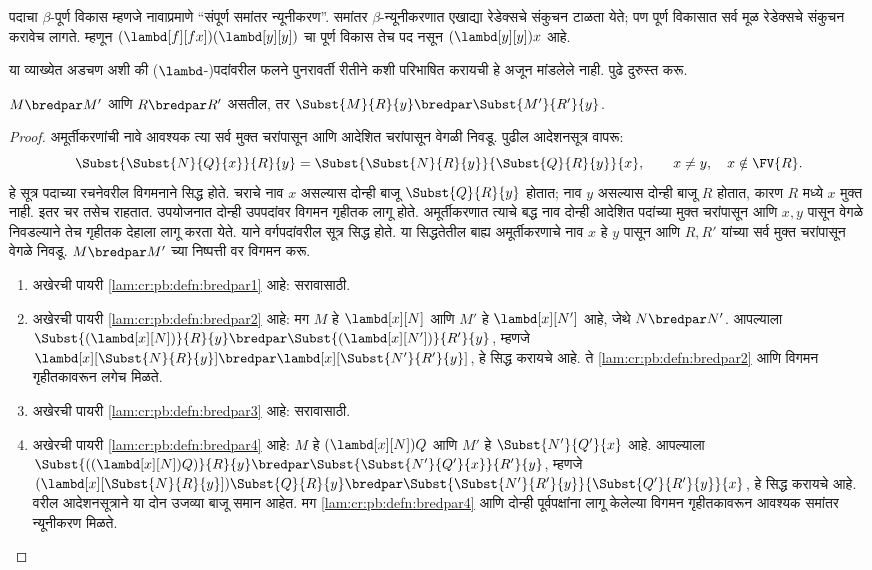 पदाचा $\beta$-पूर्ण विकास म्हणजे नावाप्रमाणे
``संपूर्ण समांतर न्यूनीकरण''. समांतर $\beta$-न्यूनीकरणात
एखाद्या रेडेक्सचे संकुचन टाळता येते; पण पूर्ण विकासात
सर्व मूळ रेडेक्सचे संकुचन करावेच लागते. म्हणून
$(\lambd[f][fx])(\lambd[y][y])$ चा पूर्ण विकास तेच
पद नसून $(\lambd[y][y])x$ आहे.

\begin{editorial}
  या व्याख्येत अडचण अशी की ($\lambd$-)पदांवरील फलने
  पुनरावर्ती रीतीने कशी परिभाषित करायची हे अजून
  मांडलेले नाही. पुढे दुरुस्त करू.
\end{editorial}

\begin{lem}\label{lam:cr:pb:lem:comp}
  $M \bredpar M'$ आणि $R \bredpar R'$ असतील, तर $\Subst{M}{R}{y}
  \bredpar \Subst{M'}{R'}{y}$.
\end{lem}

\begin{proof}

अमूर्तीकरणांची नावे आवश्यक त्या सर्व मुक्त चरांपासून
आणि आदेशित चरांपासून वेगळी निवडू. पुढील आदेशनसूत्र वापरू:
\[\Subst{\Subst{N}{Q}{x}}{R}{y}
=\Subst{\Subst{N}{R}{y}}{\Subst{Q}{R}{y}}{x},
\qquad x\ne y,\quad x\notin\FV{R}.
\]
हे सूत्र पदाच्या रचनेवरील विगमनाने सिद्ध होते. चराचे नाव
$x$ असल्यास दोन्ही बाजू $\Subst{Q}{R}{y}$ होतात;
नाव $y$ असल्यास दोन्ही बाजू $R$ होतात, कारण $R$ मध्ये
$x$ मुक्त नाही. इतर चर तसेच राहतात. उपयोजनात दोन्ही
उपपदांवर विगमन गृहीतक लागू होते. अमूर्तीकरणात त्याचे
बद्ध नाव दोन्ही आदेशित पदांच्या मुक्त चरांपासून आणि
$x,y$ पासून वेगळे निवडल्याने तेच गृहीतक देहाला लागू
करता येते. याने वर्गपदांवरील सूत्र सिद्ध होते.
या सिद्धतेतील बाह्य अमूर्तीकरणाचे नाव $x$ हे $y$ पासून
आणि $R,R'$ यांच्या सर्व मुक्त चरांपासून वेगळे निवडू.
  $M \bredpar M'$ च्या निष्पत्ती वर विगमन करू.
  \begin{enumerate}
    \item अखेरची पायरी \ref{lam:cr:pb:defn:bredpar1} आहे: सरावासाठी.
    \item अखेरची पायरी \ref{lam:cr:pb:defn:bredpar2} आहे: मग $M$ हे
      $\lambd[x][N]$ आणि $M'$ हे $\lambd[x][N']$ आहे,
      जेथे $N \bredpar N'$. आपल्याला
      $\Subst{(\lambd[x][N])}{R}{y} \bredpar
      \Subst{(\lambd[x][N'])}{R'}{y}$, म्हणजे
      $\lambd[x][\Subst{N}{R}{y}] \bredpar
      \lambd[x][\Subst{N'}{R'}{y}]$, हे सिद्ध करायचे आहे.
      ते \ref{lam:cr:pb:defn:bredpar2} आणि विगमन गृहीतकावरून
      लगेच मिळते.
    \item अखेरची पायरी \ref{lam:cr:pb:defn:bredpar3} आहे: सरावासाठी.
    \item अखेरची पायरी \ref{lam:cr:pb:defn:bredpar4} आहे: $M$ हे
      $(\lambd[x][N])Q$ आणि $M'$ हे $\Subst{N'}{Q'}{x}$ आहे.
      आपल्याला $\Subst{((\lambd[x][N])Q)}{R}{y} \bredpar
      \Subst{\Subst{N'}{Q'}{x}}{R'}{y}$, म्हणजे
      $(\lambd[x][\Subst{N}{R}{y}])\Subst{Q}{R}{y} \bredpar
      \Subst{\Subst{N'}{R'}{y}}{\Subst{Q'}{R'}{y}}{x}$,
      हे सिद्ध करायचे आहे. वरील आदेशनसूत्राने या दोन
      उजव्या बाजू समान आहेत. मग \ref{lam:cr:pb:defn:bredpar4}
      आणि दोन्ही पूर्वपक्षांना लागू केलेल्या विगमन गृहीतकावरून
      आवश्यक समांतर न्यूनीकरण मिळते.
  \end{enumerate}
\end{proof}

